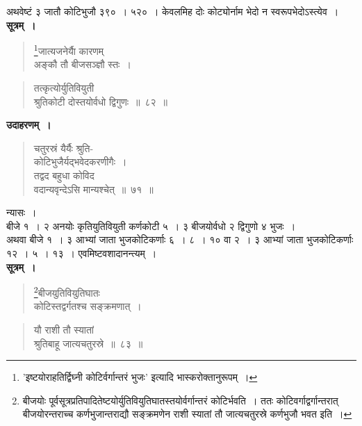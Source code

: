 \documentclass[11pt, openany]{book}
\begin{document}
 अथवेष्टं ३ जातौ कोटिभुजौ ३९०~। ५२०~। केवलमिह दोः कोट्योर्नाम
भेदो न स्वरूपभेदोऽस्त्येव~। \\

 \textbf{सूत्रम्~।} 
\begin{quote}
    \bs 
    \footnote{'{\color{violet}इष्टयोराहतिर्द्विघ्नी कोटिर्वर्गान्तरं भुजः}' इत्यादि {\color{violet}भास्करो}क्तानुरूपम्~। }जात्यजनेर्याै कारणम् \\
    अङ्कौ तौ बीजसञ्ज्ञौ स्तः~।
\end{quote}
\newpage%
\begin{quote}
    \bs 
तत्कृत्योर्युतिवियुती \\
श्रुतिकोटी दोस्तयोर्वधो द्विगुणः~॥~८२~॥
\end{quote}

\textbf{उदाहरणम्~।} 
\begin{quote}
    \bqt 
    चतुरस्रं यैर्यैः श्रुति-\\
    कोटिभुजैर्यद्भवेदकरणीगैः~।\\
तद्वद बहुधा कोविद \\
वदान्यवृन्देऽसि मान्यश्चेत्~॥~७१~॥
\end{quote}

न्यासः~। \\

\vspace{-4mm}
बीजे १~। २ अनयोः कृतियुतिवियुती कर्णकोटी ५~। ३ बीजयोर्वधो २ द्विगुणो ४ भुजः~। \\

\vspace{-4mm}
अथवा बीजे १~। ३ आभ्यां जाता भुजकोटिकर्णाः ६~। ८~। १० वा २~। ३ आभ्यां जाता भुजकोटिकर्णाः १२~। ५~। १३~। एवमिष्टवशादानन्त्यम्~। \\

\textbf{सूत्रम्~।} 
\setcounter{footnote}{0}
\begin{quote}
    \bs 
 \footnote{बीजयोः पूर्वसूत्रप्रतिपादितेष्टयोर्युतिवियुतिघातस्तयोर्वर्गान्तरं
कोटिर्भवति~। ततः कोटिवर्गाद्वर्गान्तरात् बीजयोरन्तराच्च कर्णभुजान्तराद्यौ
सङ्क्रमणेन राशी स्यातां तौ जात्यचतुरस्रे कर्णभुजौ भवत इति~।}बीजयुतिवियुतिघातः \\
कोटिस्तद्वर्गतश्च सङ्क्रमणात्~।
\end{quote}

\newpage%

\begin{quote}
    \bs 
यौ राशी तौ स्यातां \\
श्रुतिबाहू जात्यचतुरस्रे~॥~८३~॥
\end{quote}
\end{document}
